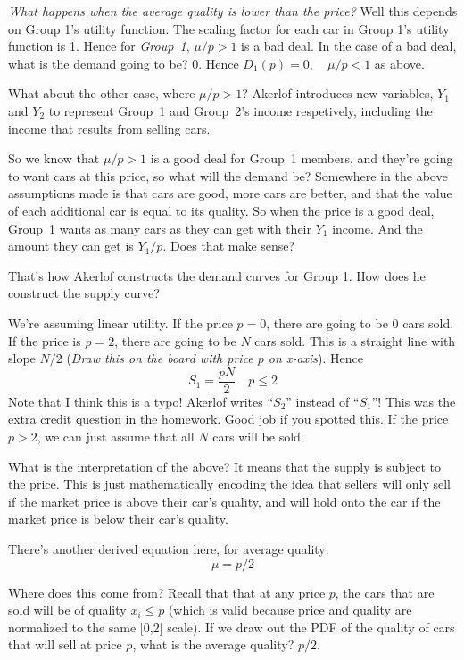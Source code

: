 \documentclass[11pt]{article}
\begin{document}
{\it What happens when the average quality is lower than the price?} Well this depends on Group 1's utility function. The scaling factor for each car in Group 1's utility function is 1. Hence for {\it Group~1}, $\mu/p > 1$ is a bad deal. In the case of a bad deal, what is the demand going to be? 0. Hence $D_1(p) = 0, \quad \mu/p < 1$ as above.

What about the other case, where $\mu/p > 1$? Akerlof introduces new variables, $Y_1$ and $Y_2$ to represent Group~1 and Group~2's income respetively, including the income that results from selling cars. 

So we know that $\mu/p > 1$ is a good deal for Group~1 members, and they're going to want cars at this price, so what will the demand be? Somewhere in the above assumptions made is that cars are good, more cars are better, and that the value of each additional car is equal to its quality. So when the price is a good deal, Group~1 wants as many cars as they can get with their $Y_1$ income. And the amount they can get is $Y_1/p$. Does that make sense?

That's how Akerlof constructs the demand curves for Group 1. How does he construct the supply curve? 

We're assuming linear utility. If the price $p=0$, there are going to be 0 cars sold. If the price is $p=2$, there are going to be $N$ cars sold. This is a straight line with slope $N/2$ ({\it Draw this on the board with price $p$ on x-axis}). Hence 
\begin{equation}
    S_1 = \frac{pN}{2} \quad p \leq 2
\end{equation}
Note that I think this is a typo! Akerlof writes ``$S_2$'' instead of ``$S_1$''! This was the extra credit question in the homework. Good job if you spotted this. If the price $p>2$, we can just assume that all $N$ cars will be sold. 

What is the interpretation of the above? It means that the supply is subject to the price. This is just mathematically encoding the idea that sellers will only sell if the market price is above their car's quality, and will hold onto the car if the market price is below their car's quality. 

There's another derived equation here, for average quality:
\begin{equation}
    \mu = p/2
\end{equation}

Where does this come from? Recall that that at any price $p$, the cars that are sold will be of quality $x_i \leq p$ (which is valid because price and quality are normalized to the same [0,2] scale). If we draw out the PDF of the quality of cars that will sell at price $p$, what is the average quality? $p/2$.
\end{document}
